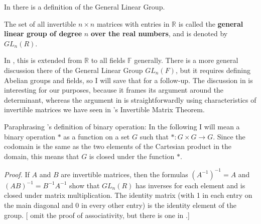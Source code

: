 \documentclass[10pt,letterpaper,final]{report}
\begin{document}
In \cite{BeachyBlair2006AbstractAlgebra} there is a definition of the General Linear Group.

\begin{tcolorbox}[colback=blue!10!white, colframe=blue!10!black, title={3.1.11 - Definition of the General Linear Group \citetitle[Ch. 3, p. 100]{BeachyBlair2006AbstractAlgebra}}]
  The set of all invertible $n \times n$ matrices with entries in $\mathbb{R}$ is called the \textbf{general linear group of degree } $n$ \textbf{ over the real numbers}, and is denoted by $GL_n(R)$.
\end{tcolorbox}

In \textcite[Ch. 1.4 Matrix Groups, pp. 34-5]{Dummit2004AbstractAlgebra}, this is extended from $\mathbb{R}$ to all fields $\mathbb{F}$ generally. There is a more general discussion there of the General Linear Group $GL_n(F)$, but it requires defining Abelian groups and fields, so I will save that for a follow-up. The discussion in \textcite{Dummit2004AbstractAlgebra} is interesting for our purposes, because it frames its argument around the determinant, whereas the argument in \textcite{BeachyBlair2006AbstractAlgebra} is straightforwardly using characteristics of invertible matrices we have seen in \citeauthor{LayEtAl2020LinearAlgebraAndItsApplications}'s Invertible Matrix Theorem.

Paraphrasing \textcite[Ch. 3.1, p. 89]{BeachyBlair2006AbstractAlgebra}'s definition of binary operation: In the following I will mean a binary operation $*$ as a function on a set $G$ such that $*: G \times G \to G$. Since the codomain is the same as the two elements of the Cartesian product in the domain, this means that $G$ is closed under the function $*$.

\begin{tcolorbox}[colback=blue!10!white, colframe=blue!10!black, title={3.1.12 - Proposition. The set $GL_n(R)$ forms a group under matrix multiplication. \citetitle[Ch. 3, p. 100]{BeachyBlair2006AbstractAlgebra}}]
  \emph{Proof.} If $A$ and $B$ are invertible matrices, then the formulas $(A^{-1})^{-1} = A$ and $(AB)^{-1} = B^{-1}A^{-1}$ show that $GL_n(R)$ has inverses for each element and is closed under matrix multiplication. The identity matrix (with 1 in each entry on the main diagonal and 0 in every other entry) is the identity element of the group. [\citeauthor{BeachyBlair2006AbstractAlgebra} omit the proof of associativity, but there is one in \textcite[Ch. 2.1, pp. 103-4]{LayEtAl2020LinearAlgebraAndItsApplications}.]
\end{tcolorbox}
\end{document}
